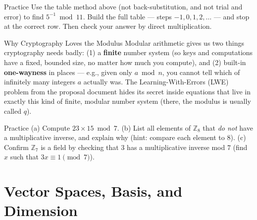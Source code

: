 \begin{exercisebox}{Practice}
Use the table method above (not back-substitution, and not trial and error) to find $5^{-1} \bmod 11$. Build the full table --- steps $-1, 0, 1, 2, \ldots$ --- and stop at the correct row. Then check your answer by direct multiplication.
\end{exercisebox}

\begin{previewbox}{Why Cryptography Loves the Modulus}
Modular arithmetic gives us two things cryptography needs badly: (1) a \textbf{finite} number system (so keys and computations have a fixed, bounded size, no matter how much you compute), and (2) built-in \textbf{one-wayness} in places --- e.g., given only $a \bmod n$, you cannot tell which of infinitely many integers $a$ actually was. The Learning-With-Errors (LWE) problem from the proposal document hides its secret inside equations that live in exactly this kind of finite, modular number system (there, the modulus is usually called $q$).
\end{previewbox}

\begin{exercisebox}{Practice}
(a) Compute $23 \times 15 \bmod 7$. (b) List all elements of $\mathbb{Z}_8$ that \emph{do not} have a multiplicative inverse, and explain why (hint: compare each element to $8$). (c) Confirm $\mathbb{Z}_7$ is a field by checking that $3$ has a multiplicative inverse mod $7$ (find $x$ such that $3x \equiv 1 \pmod 7$).
\end{exercisebox}

\section{Vector Spaces, Basis, and Dimension}
\label{sec:L1:vector-spaces-basis-and-dimension}


